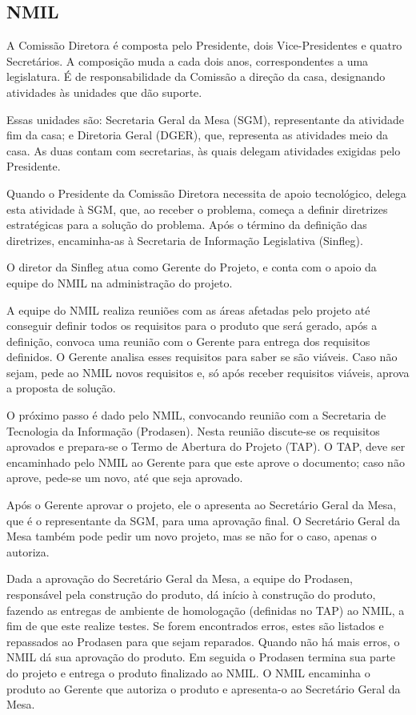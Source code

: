 \subsection{NMIL}

A Comissão Diretora é composta pelo Presidente, dois Vice-Presidentes e quatro
Secretários. A composição muda a cada dois anos, correspondentes a uma legislatura. É de responsabilidade da Comissão a direção da casa, designando atividades às unidades que dão suporte.

Essas unidades são: Secretaria Geral da Mesa (SGM), representante da atividade fim da casa; e Diretoria Geral (DGER), que, representa as atividades meio da casa. As duas contam com secretarias, às quais delegam atividades exigidas pelo Presidente.

Quando o Presidente da Comissão Diretora necessita de apoio tecnológico, delega esta
atividade à SGM, que, ao receber o problema, começa a definir diretrizes estratégicas para a solução do problema. Após o término da definição das diretrizes, encaminha-as à Secretaria de Informação Legislativa (Sinfleg).

O diretor da Sinfleg atua como Gerente do Projeto, e conta com o apoio da equipe do
NMIL na administração do projeto.

A equipe do NMIL realiza reuniões com as áreas afetadas pelo projeto até conseguir
definir todos os requisitos para o produto que será gerado, após a definição, convoca uma reunião com o Gerente para entrega dos requisitos definidos. O Gerente analisa esses requisitos para saber se são viáveis. Caso não sejam, pede ao NMIL novos requisitos e, só após receber requisitos viáveis, aprova a proposta de solução.

O próximo passo é dado pelo NMIL, convocando reunião com a Secretaria de Tecnologia da Informação (Prodasen). Nesta reunião discute-se os requisitos aprovados e prepara-se o Termo de Abertura do Projeto (TAP). O TAP, deve ser encaminhado pelo NMIL ao Gerente para que este aprove o documento; caso não aprove, pede-se um novo, até que seja aprovado.

Após o Gerente aprovar o projeto, ele o apresenta ao Secretário Geral da Mesa, que é o representante da SGM, para uma aprovação final. O Secretário Geral da Mesa também pode pedir um novo projeto, mas se não for o caso, apenas o autoriza.

Dada a aprovação do Secretário Geral da Mesa, a equipe do Prodasen, responsável pela
construção do produto, dá início à construção do produto, fazendo as entregas de ambiente de homologação (definidas no TAP) ao NMIL, a fim de que este realize testes. Se forem encontrados erros, estes são listados e repassados ao Prodasen para que sejam reparados. Quando não há mais erros, o NMIL dá sua aprovação do produto. Em seguida o Prodasen termina sua parte do projeto e entrega o produto finalizado ao NMIL. O NMIL encaminha o produto ao
Gerente que autoriza o produto e apresenta-o ao Secretário Geral da Mesa.

